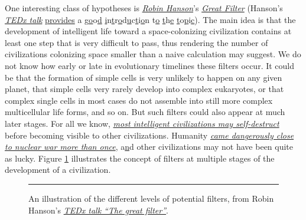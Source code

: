 \documentclass[]{article}
\begin{document}
One interesting class of hypotheses is
\href{https://en.wikipedia.org/wiki/Robin_Hanson}{\emph{Robin Hanson}}'s
\href{https://en.wikipedia.org/wiki/Great_Filter}{\emph{Great Filter}}
(Hanson's \href{https://www.youtube.com/watch?v=aspMV6ERqpo}{\emph{TEDx
talk}} \href{https://www.youtube.com/watch?v=aspMV6ERqpo}{provides} a
g\href{https://www.youtube.com/watch?v=aspMV6ERqpo}{o}o\href{https://www.youtube.com/watch?v=aspMV6ERqpo}{d}
\href{https://www.youtube.com/watch?v=aspMV6ERqpo}{i}n\href{https://www.youtube.com/watch?v=aspMV6ERqpo}{t}r\href{https://www.youtube.com/watch?v=aspMV6ERqpo}{o}d\href{https://www.youtube.com/watch?v=aspMV6ERqpo}{u}c\href{https://www.youtube.com/watch?v=aspMV6ERqpo}{t}i\href{https://www.youtube.com/watch?v=aspMV6ERqpo}{o}n
t\href{https://www.youtube.com/watch?v=aspMV6ERqpo}{o}
\href{https://www.youtube.com/watch?v=aspMV6ERqpo}{t}h\href{https://www.youtube.com/watch?v=aspMV6ERqpo}{e}
\href{https://www.youtube.com/watch?v=aspMV6ERqpo}{t}o\href{https://www.youtube.com/watch?v=aspMV6ERqpo}{p}i\href{https://www.youtube.com/watch?v=aspMV6ERqpo}{c}).
The main idea is that the development of intelligent life toward a
space-colonizing civilization contains at least one step that is very
difficult to pass, thus rendering the number of civilizations colonizing
space smaller than a naive calculation may suggest. We do not know how
early or late in evolutionary timelines these filters occur. It could be
that the formation of simple cells is very unlikely to happen on any
given planet, that simple cells very rarely develop into complex
eukaryotes, or that complex single cells in most cases do not assemble
into still more complex multicellular life forms, and so on. But such
filters could also appear at much later stages. For all we know,
\href{https://en.wikipedia.org/wiki/Fermi_paradox\#It_is_the_nature_of_intelligent_life_to_destroy_itself}{\emph{most
intelligent civilizations may self-destruct}} before becoming visible to
other civilizations. Humanity
\href{https://en.wikipedia.org/wiki/List_of_nuclear_close_calls}{\emph{came
dangerously close to nuclear war more than once}},
a\href{https://en.wikipedia.org/wiki/List_of_nuclear_close_calls}{n}d
other civilizations may not have been quite as lucky. Figure
\ref{great-filter} illustrates the concept of filters
at multiple stages of the development of a civilization.

\begin{figure}[h!]
    \centering
    \rule{2cm}{2cm}
    \caption{An illustration of the different levels of
potential filters, from Robin Hanson's
\href{https://www.youtube.com/watch?v=aspMV6ERqpo}{\emph{TEDx talk ``The
great filter''}}.}
    \label{great-filter}
\end{figure}
\end{document}

